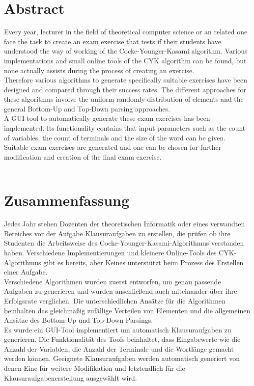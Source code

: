 \section*{Abstract}\label{abtract}
Every year, lecturer in the field of theoretical computer science or an related one face the task to create an exam exercise that tests if their students have understood the way of working of the Cocke-Younger-Kasami algorithm. Various implementations and small online tools of the CYK algorithm can be found, but none actually assists during the process of creating an exercise.\\
Therefore various algorithms to generate specifically suitable exercises have been designed and compared through their success rates. The different approaches for these algorithms involve the uniform randomly distribution of elements and the general Bottom-Up and Top-Down parsing approaches.\\
A GUI tool to automatically generate these exam exercises has been implemented. Its functionality contains that input parameters such as the count of variables, the count of terminals and the size of the word can be given. Suitable exam exercises are generated and one can be chosen for further modification and creation of the final exam exercise.\\


~~

\section*{Zusammenfassung}\label{zusammenfassung}
Jedes Jahr stehen Dozenten der theoretischen Informatik oder eines verwandten Bereiches vor der Aufgabe Klausuraufgaben zu erstellen, die prüfen ob ihre Studenten die Arbeitsweise des Cocke-Younger-Kasami-Algorithmus verstanden haben. Verschiedene Implementierungen und kleinere Online-Tools des CYK-Algorithmus gibt es bereits, aber Keines unterstützt beim Prozess des Erstellen einer Aufgabe.\\
Verschiedene Algorithmen wurden zuerst entworfen, um genau passende Aufgaben zu generieren und wurden anschließend auch miteinander über ihre Erfolgsrate verglichen. Die unterschiedlichen Ansätze für die Algorithmen beinhalten das gleichmäßig zufällige Verteilen von Elementen und die allgemeinen Ansätze des Bottom-Up und Top-Down Parsings.\\
Es wurde ein GUI-Tool implementiert um automatisch Klausuraufgaben zu generieren. Die Funktionalität des Tools beinhaltet, dass Eingabewerte wie die Anzahl der Variablen, die Anzahl der Terminale und die Wortlänge gemacht werden können. Geeignete Klausuraufgaben werden automatisch generiert von denen Eine für weitere Modifikation und letztendlich für die Klausuraufgabenerstellung ausgewählt wird.\\



\pagebreak

